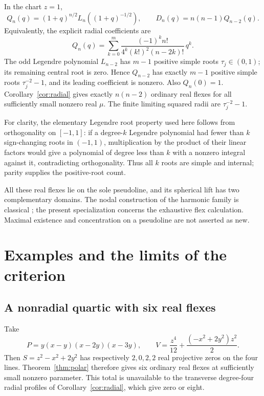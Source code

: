 \documentclass[11pt,a4paper]{article}
\theoremstyle{remark}
\begin{document}
In the chart \(z=1\),
\[
 Q_n(q)=(1+q)^{n/2}L_n((1+q)^{-1/2}),\qquad
 D_n(q)=n(n-1)Q_{n-2}(q).
\]
Equivalently, the explicit radial coefficients are
\[
 Q_n(q)=\sum_{k=0}^{m}
       \frac{(-1)^k n!}{4^k(k!)^2(n-2k)!}\,q^k.
\]
The odd Legendre polynomial \(L_{n-2}\) has \(m-1\) positive
simple roots \(\tau_j\in(0,1)\); its remaining central root is
zero. Hence \(Q_{n-2}\) has exactly \(m-1\) positive simple
roots \(\tau_j^{-2}-1\), and its leading coefficient is
nonzero. Also \(Q_n(0)=1\). Corollary~\ref{cor:radial} gives
exactly \(n(n-2)\) ordinary real flexes for all sufficiently
small nonzero real \(\mu\). The finite limiting squared radii
are \(\tau_j^{-2}-1\).

For clarity, the elementary Legendre root property used here
follows from orthogonality on \([-1,1]\): if a degree-\(k\)
Legendre polynomial had fewer than \(k\) sign-changing roots
in \((-1,1)\), multiplication by the product of their linear
factors would give a polynomial of degree less than \(k\)
with a nonzero integral against it, contradicting orthogonality.
Thus all \(k\) roots are simple and internal; parity supplies
the positive-root count.

All these real flexes lie on the sole pseudoline, and its
spherical lift has two complementary domains. The nodal
construction of the harmonic family is classical
\citep[Proposition~1(i), preprint version]{berardhelffer};
the present specialization concerns the exhaustive flex
calculation. Maximal existence and concentration on a
pseudoline are not asserted as new.

\section{Examples and the limits of the criterion}

\subsection{A nonradial quartic with six real flexes}

Take
\begin{equation}\label{eq:quartic}
 P=y(x-y)(x-2y)(x-3y),\qquad
 V=\frac{z^4}{12}+\frac{(-x^2+2y^2)z^2}{2}.
\end{equation}
Then \(S=z^2-x^2+2y^2\) has respectively \(2,0,2,2\)
real projective zeros on the four lines. Theorem~\ref{thm:polar}
therefore gives six ordinary real flexes at sufficiently
small nonzero parameter. This total is unavailable to
the transverse degree-four radial profiles of
Corollary~\ref{cor:radial}, which give zero or eight.
\end{document}

